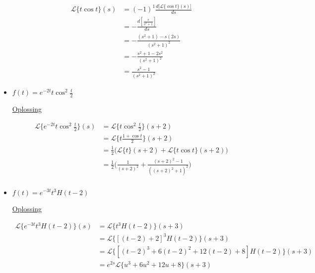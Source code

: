 \documentclass[12pt]{report}
\newcommand{\exercise}[2]{
#1


\underline{Oplossing}

#2

\hrulefill
}
\begin{document}
\begin{itemize}[label={}]
{{\begin{equation*}
         \begin{split}
          \mathcal{L}\{t\cos t\}(s) & = (-1)^1 \frac{d\bigg[\mathcal{L}\{\cos t\}(s)\bigg]}{ds} \\
                                    & = - \frac{d[\frac{s}{s^2 + 1}]}{ds} \\
                                    & = -\frac{(s^2 + 1) - s(2s)}{(s^2 + 1)^2} \\
                                    & = -\frac{s^2 + 1 - 2s^2}{(s^2 + 1)^2} \\
                                    & = \frac{s^2 - 1}{(s^2 + 1)^2}
         \end{split}
        \end{equation*}
    }
 }
 
 \item{
    \exercise{
        $f(t) = e^{-2t}t\cos^2 \frac{t}{2}$
    }{
        \begin{equation*}
         \begin{split}
          \mathcal{L}\{e^{-2t}t\cos^2 \frac{t}{2}\}(s) & = \mathcal{L}\{t\cos^2 \frac{t}{2}\}(s + 2) \\
                                                       & = \mathcal{L}\bigg\{t\frac{1 + \cos t}{2}\bigg\}(s + 2) \\
                                                       & = \frac{1}{2}\bigg(\mathcal{L}\{t\}(s + 2) + \mathcal{L}\{t \cos t\}(s+2)\bigg) \\
                                                       & = \frac{1}{2}\bigg(\frac{1}{(s+2)^2} + \frac{(s+2)^2 - 1}{((s+2)^2 + 1)^2}\bigg) \\
         \end{split}
        \end{equation*}
    }
 }
 \item{
    \exercise{
        $f(t) = e^{-3t}t^3H(t - 2)$
    }{
        \begin{equation*}
         \begin{split}
          \mathcal{L}\{e^{-3t}t^3H(t - 2)\}(s) & = \mathcal{L}\{t^3H(t - 2)\}(s + 3) \\
                                               & = \mathcal{L}\{[(t-2)+2]^3H(t-2)\}(s + 3) \\
                                               & = \mathcal{L}\{[(t-2)^3 + 6(t-2)^2+12(t-2) + 8]H(t-2)\}(s + 3) \\
                                               & = e^{2s}\mathcal{L}\{u^3 + 6u^2 + 12u + 8\}(s + 3) \\

\end{split}
\end{equation*}}}
\end{itemize}
\end{document}
